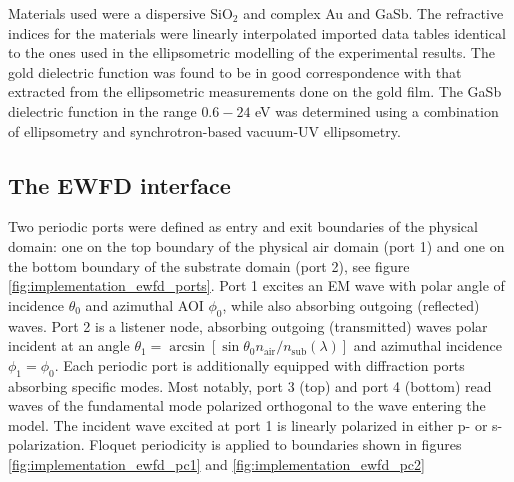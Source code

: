 Materials used were a dispersive SiO$_2$ and complex Au and GaSb. The refractive indices for the materials were linearly interpolated imported data tables identical to the ones used in the ellipsometric modelling of the experimental results. The gold dielectric function was found to be in good correspondence with that extracted from the ellipsometric measurements done on the gold film\cite{brakstad_thesis}. The GaSb dielectric function in the range $0.6-24$ eV was determined using a combination of ellipsometry and synchrotron-based vacuum-UV ellipsometry\cite{gasb_nk}. 

\subsection{The EWFD interface}
Two periodic ports were defined as entry and exit boundaries of the physical domain: one on the top boundary of the physical air domain (port 1) and one on the bottom boundary of the substrate domain (port 2), see figure \ref{fig:implementation_ewfd_ports}. Port 1 excites an EM wave with polar angle of incidence $\theta_0$ and azimuthal AOI $\phi_0$, while also absorbing outgoing (reflected) waves. Port 2 is a listener node, absorbing outgoing (transmitted) waves polar incident at an angle $\theta_1 = \arcsin[\sin\theta_0 n_{\text{air}}/n_{\text{sub}}(\lambda)]$ and azimuthal incidence $\phi_1=\phi_0$. Each periodic port is additionally equipped with diffraction ports absorbing specific modes. Most notably, port 3 (top) and port 4 (bottom) read waves of the fundamental mode polarized orthogonal to the wave entering the model. The incident wave excited at port 1 is linearly polarized in either p- or s-polarization. Floquet periodicity is applied to boundaries shown in figures \ref{fig:implementation_ewfd_pc1} and \ref{fig:implementation_ewfd_pc2}

